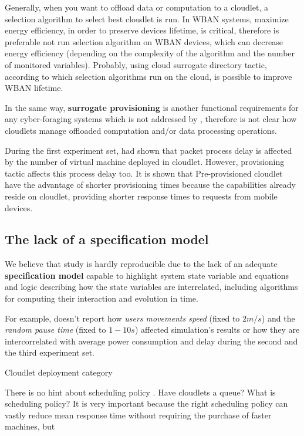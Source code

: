 \documentclass[sigchi]{acmart}
\begin{document}
Generally, when you want to offload data or computation to a cloudlet, a selection algorithm to select best cloudlet is run. In WBAN systems, maximize energy efficiency, in order to preserve devices lifetime, is critical, therefore is preferable not run selection algorithm on WBAN devices, which can decrease energy efficiency (depending on the complexity of the algorithm and the number of monitored variables). Probably, using cloud surrogate directory tactic, according to which selection algorithms run on the cloud, is possible to improve WBAN lifetime. \cite{DecisionModel}

In the same way, \textbf{surrogate provisioning} is another functional requirements for any cyber-foraging systems which is not addressed by \citep{MSAReport}, therefore is not clear how cloudlets manage offloaded computation and/or data processing operations.

During the first experiment set, \citet{MSAReport} had shown that packet process delay is affected by the number of virtual machine deployed in cloudlet. However, provisioning tactic affects this process delay too. It is shown that Pre-provisioned cloudlet have the advantage of shorter provisioning times because the capabilities already reside on cloudlet, providing shorter response times to requests from mobile devices.\cite{DecisionModel}

\subsection{The lack of a specification model}

We believe that \citet{MSAReport} study is hardly reproducible due to the lack of an adequate \textbf{specification model} capable to highlight system state variable and equations and logic describing how the state variables are interrelated, including algorithms for computing their interaction and evolution in time.

For example, \citet{MSAReport} doesn't report how \textit{users movements speed} (fixed to $2 m/s$) and the \textit{random pause time} (fixed to $1-10 s$) affected simulation's results or how they are intercorrelated with average power consumption and delay during the second and the third experiment set.

Cloudlet deployment category 

There is no hint about scheduling policy . Have cloudlets a queue? What is scheduling policy? It is very important because the right scheduling policy can vastly reduce
mean response time without requiring the purchase of faster machines, but 
\end{document}
